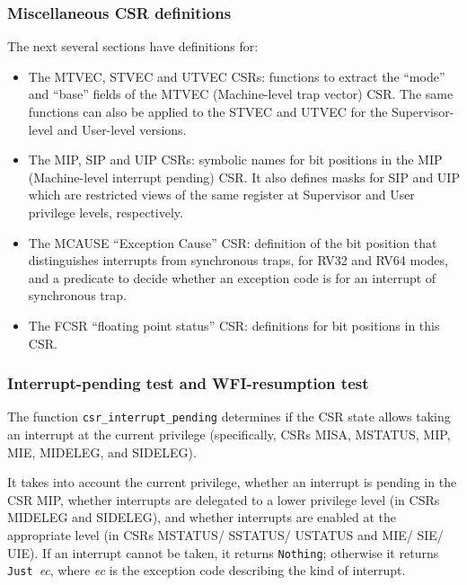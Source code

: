 \documentclass[11pt]{article}
\begin{document}

\subsubsection{Miscellaneous CSR definitions}

The next several sections have definitions for:

\begin{itemize}

\item The MTVEC, STVEC and UTVEC CSRs: functions to extract the
``mode'' and ``base'' fields of the MTVEC (Machine-level trap vector)
CSR.  The same functions can also be applied to the STVEC and UTVEC
for the Supervisor-level and User-level versions.

\item The MIP, SIP and UIP CSRs: symbolic names for bit positions in
the MIP (Machine-level interrupt pending) CSR.  It also defines masks
for SIP and UIP which are restricted views of the same register at
Supervisor and User privilege levels, respectively.

\item The MCAUSE ``Exception Cause'' CSR: definition of the bit
position that distinguishes interrupts from synchronous traps, for
RV32 and RV64 modes, and a predicate to decide whether an exception
code is for an interrupt of synchronous trap.

\item The FCSR ``floating point status'' CSR: definitions for bit
positions in this CSR.

\end{itemize}



\subsubsection{Interrupt-pending test and WFI-resumption test}

\label{csr_interrupt_pending}

The function \verb|csr_interrupt_pending| determines if the CSR state
allows taking an interrupt at the current privilege (specifically,
CSRs MISA, MSTATUS, MIP, MIE, MIDELEG, and SIDELEG).

It takes into account the current privilege, whether an interrupt is
pending in the CSR MIP, whether interrupts are delegated to a lower
privilege level (in CSRs MIDELEG and SIDELEG), and whether interrupts
are enabled at the appropriate level (in CSRs MSTATUS/ SSTATUS/
USTATUS and MIE/ SIE/ UIE).  If an interrupt cannot be taken, it
returns \verb|Nothing|; otherwise it returns \verb|Just|~\emph{ec},
where \emph{ec} is the exception code describing the kind of
interrupt.
\end{document}
